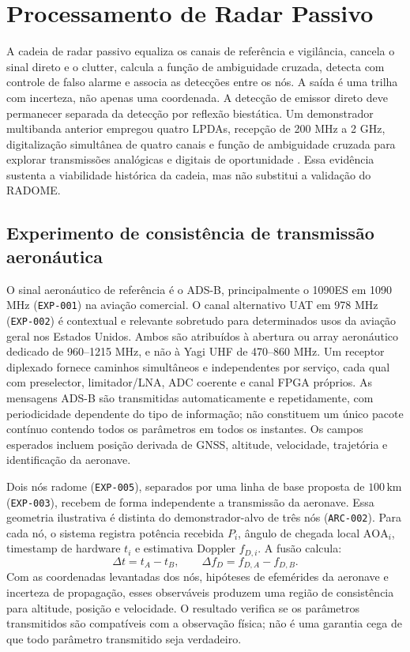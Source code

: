 \chapter{Processamento de Radar Passivo}

A cadeia de radar passivo equaliza os canais de referência e vigilância, cancela o sinal direto e o clutter, calcula a função de ambiguidade cruzada, detecta com controle de falso alarme e associa as detecções entre os nós. A saída é uma trilha com incerteza, não apenas uma coordenada. A detecção de emissor direto deve permanecer separada da detecção por reflexão biestática. Um demonstrador multibanda anterior empregou quatro LPDAs, recepção de 200 MHz a 2 GHz, digitalização simultânea de quatro canais e função de ambiguidade cruzada para explorar transmissões analógicas e digitais de oportunidade \cite{gould2006multiband}. Essa evidência sustenta a viabilidade histórica da cadeia, mas não substitui a validação do RADOME.

\section{Experimento de consistência de transmissão aeronáutica}
O sinal aeronáutico de referência é o ADS-B, principalmente o 1090ES em 1090 MHz (\texttt{EXP-001}) na aviação comercial. O canal alternativo UAT em 978 MHz (\texttt{EXP-002}) é contextual e relevante sobretudo para determinados usos da aviação geral nos Estados Unidos. Ambos são atribuídos à abertura ou array aeronáutico dedicado de 960--1215 MHz, e não à Yagi UHF de 470--860 MHz. Um receptor diplexado fornece caminhos simultâneos e independentes por serviço, cada qual com preselector, limitador/LNA, ADC coerente e canal FPGA próprios. As mensagens ADS-B são transmitidas automaticamente e repetidamente, com periodicidade dependente do tipo de informação; não constituem um único pacote contínuo contendo todos os parâmetros em todos os instantes. Os campos esperados incluem posição derivada de GNSS, altitude, velocidade, trajetória e identificação da aeronave.

Dois nós radome (\texttt{EXP-005}), separados por uma linha de base proposta de $100\,\mathrm{km}$ (\texttt{EXP-003}), recebem de forma independente a transmissão da aeronave. Essa geometria ilustrativa é distinta do demonstrador-alvo de três nós (\texttt{ARC-002}). Para cada nó, o sistema registra potência recebida $P_i$, ângulo de chegada local $\mathrm{AOA}_i$, timestamp de hardware $t_i$ e estimativa Doppler $f_{D,i}$. A fusão calcula:
\[
\Delta t=t_A-t_B,\qquad \Delta f_D=f_{D,A}-f_{D,B}.
\]
Com as coordenadas levantadas dos nós, hipóteses de efemérides da aeronave e incerteza de propagação, esses observáveis produzem uma região de consistência para altitude, posição e velocidade. O resultado verifica se os parâmetros transmitidos são compatíveis com a observação física; não é uma garantia cega de que todo parâmetro transmitido seja verdadeiro.

